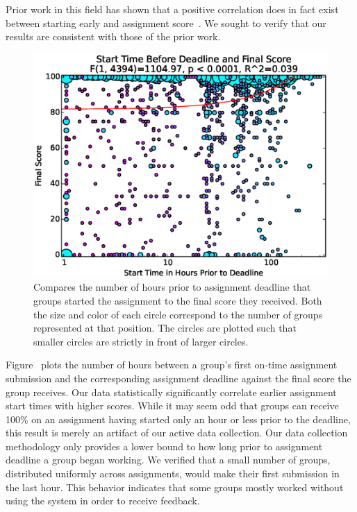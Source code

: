 Prior work in this field has shown that a positive correlation does in fact
exist between starting early and assignment
score~\cite{Spacco:2013:TIP:2462476.2465594,
  Edwards:2009:CEI:1584322.1584325}. We sought to verify that our results are
consistent with those of the prior work.

\begin{figure}[!t]
\centering
\includegraphics[width=5.25in]{graphs/Start_Time_Before_Deadline_and_Final_Score.eps}
\caption{Compares the number of hours prior to assignment deadline that groups
  started the assignment to the final score they received. Both the size and
  color of each circle correspond to the number of groups represented at that
  position. The circles are plotted such that smaller circles are strictly in
  front of larger circles.}
\end{figure}

Figure~ plots the number of hours between a
group's first on-time assignment submission and the corresponding assignment
deadline against the final score the group receives. Our data statistically
significantly correlate earlier assignment start times with higher
scores. While it may seem odd that groups can receive 100\% on an assignment
having started only an hour or less prior to the deadline, this result is
merely an artifact of our active data collection. Our data collection
methodology only provides a lower bound to how long prior to assignment
deadline a group began working. We verified that a small number of groups,
distributed uniformly across assignments, would make their first submission in
the last hour. This behavior indicates that some groups mostly worked without
using the system in order to receive feedback.

